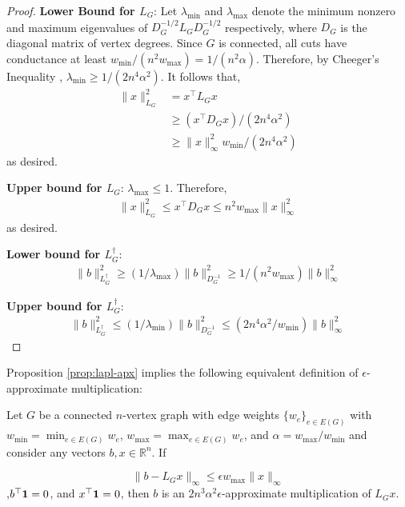 \begin{proof}
\textbf{Lower Bound for $L_G$}: Let $\lambda_{\min}$ and $\lambda_{\max}$ denote the minimum nonzero and maximum eigenvalues of $D_G^{-1/2}L_GD_G^{-1/2}$ respectively, where $D_G$ is the diagonal matrix of vertex degrees. Since $G$ is connected, all cuts have conductance at least $w_{\min}/(n^2 w_{\max}) = 1/(n^2\alpha)$. Therefore, by Cheeger's Inequality \cite{c70}, $\lambda_{\min} \ge 1/(2n^4 \alpha^2)$. It follows that,
\begin{align*}
\|x\|_{L_G}^2 &= x^{\top} L_G x\\
&\ge (x^{\top} D_G x)/(2n^4 \alpha^2)\\
&\ge \|x\|_{\infty}^2 w_{\min}/(2n^4 \alpha^2)
\end{align*}
as desired.

\textbf{Upper bound for $L_G$}: $\lambda_{\max}\le 1$. Therefore,
\begin{align*}
\|x\|_{L_G}^2 
\le x^{\top} D_G x 
\le n^2 w_{\max} \|x\|_{\infty}^2
\end{align*}
as desired.

\textbf{Lower bound for $L_G^{\dag}$}:
\begin{align*}
\|b\|_{L_G^{\dag}}^2 
\ge (1/\lambda_{\max}) \|b\|_{D_G^{-1}}^2
\ge 1/(n^2 w_{\max}) \|b\|_{\infty}^2
\end{align*}

\textbf{Upper bound for $L_G^{\dag}$}:
\begin{align*}
\|b\|_{L_G^{\dag}}^2 \le (1/\lambda_{\min}) \|b\|_{D_G^{-1}}^2
\le (2n^4\alpha^2/w_{\min}) \|b\|_{\infty}^2
\end{align*}
\end{proof}

Proposition \ref{prop:lapl-apx} implies the following equivalent definition of $\epsilon$-approximate multiplication:

\begin{corollary}\label{cor:simpleapproxmult}
Let $G$ be a connected $n$-vertex graph with edge weights $\{w_e\}_{e\in E(G)}$ with $w_{\min} = \min_{e\in E(G)} w_e$, $w_{\max} = \max_{e\in E(G)} w_e$, and $\alpha = w_{\max}/w_{\min}$ and consider any vectors $b,x\in \mathbb{R}^n$. If

$$\|b - L_Gx\|_{\infty} \le \epsilon w_{\max} \|x\|_{\infty}$$
,$b^\top {\bf 1} = 0$, and $x^\top {\bf 1} = 0$, then $b$ is an $2n^3\alpha^2\epsilon$-approximate multiplication of $L_Gx$.
\end{corollary}

